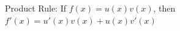 \documentclass[preview]{standalone}
\begin{document}
\begin{center}
Product Rule: If $f(x) = u(x)v(x)$, then $f'(x) = u'(x)v(x) + u(x)v'(x)$
\end{center}
\end{document}
